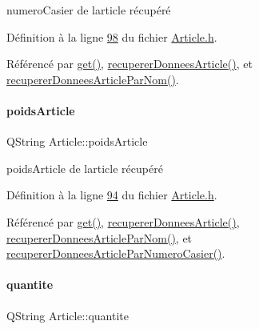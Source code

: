 numero\+Casier de l\textquotesingle{}article récupéré 



Définition à la ligne \hyperlink{_article_8h_source_l00098}{98} du fichier \hyperlink{_article_8h_source}{Article.\+h}.



Référencé par \hyperlink{_article_8cpp_source_l00266}{get()}, \hyperlink{_article_8cpp_source_l00050}{recuperer\+Donnees\+Article()}, et \hyperlink{_article_8cpp_source_l00103}{recuperer\+Donnees\+Article\+Par\+Nom()}.

\mbox{\label{class_article_ac42217ed32ef1466b099f3e4a6a913f0}} 
\paragraph{\texorpdfstring{poids\+Article}{poidsArticle}}
{\footnotesize\ttfamily Q\+String Article\+::poids\+Article\hspace{0.3cm}{\ttfamily [private]}}



poids\+Article de l\textquotesingle{}article récupéré 



Définition à la ligne \hyperlink{_article_8h_source_l00094}{94} du fichier \hyperlink{_article_8h_source}{Article.\+h}.



Référencé par \hyperlink{_article_8cpp_source_l00266}{get()}, \hyperlink{_article_8cpp_source_l00050}{recuperer\+Donnees\+Article()}, \hyperlink{_article_8cpp_source_l00103}{recuperer\+Donnees\+Article\+Par\+Nom()}, et \hyperlink{_article_8cpp_source_l00156}{recuperer\+Donnees\+Article\+Par\+Numero\+Casier()}.

\mbox{\label{class_article_a0870104453080b43bc271346217a864b}} 
\paragraph{\texorpdfstring{quantite}{quantite}}
{\footnotesize\ttfamily Q\+String Article\+::quantite\hspace{0.3cm}{\ttfamily [private]}}



